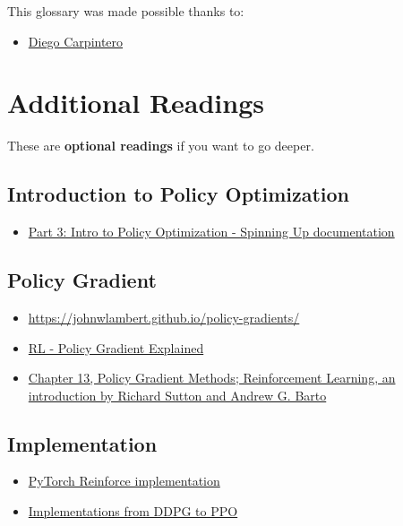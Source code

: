 \documentclass[11pt,a4paper]{article}
\begin{document}
This glossary was made possible thanks to:

\begin{itemize}
\tightlist
\item
  \href{https://github.com/dcarpintero}{Diego Carpintero}
\end{itemize}

\section{Additional Readings}\label{additional-readings}

These are \textbf{optional readings} if you want to go deeper.

\subsection{Introduction to Policy Optimization}\label{introduction-to-policy-optimization}

\begin{itemize}
\tightlist
\item
  \href{https://spinningup.openai.com/en/latest/spinningup/rl_intro3.html}{Part 3: Intro to Policy Optimization - Spinning Up documentation}
\end{itemize}

\subsection{Policy Gradient}\label{policy-gradient}

\begin{itemize}
\tightlist
\item
  \url{https://johnwlambert.github.io/policy-gradients/}
\item
  \href{https://jonathan-hui.medium.com/rl-policy-gradients-explained-9b13b688b146}{RL - Policy Gradient Explained}
\item
  \href{http://incompleteideas.net/book/RLbook2020.pdf}{Chapter 13, Policy Gradient Methods; Reinforcement Learning, an introduction by Richard Sutton and Andrew G. Barto}
\end{itemize}

\subsection{Implementation}\label{implementation}

\begin{itemize}
\tightlist
\item
  \href{https://github.com/pytorch/examples/blob/main/reinforcement_learning/reinforce.py}{PyTorch Reinforce implementation}
\item
  \href{https://github.com/MrSyee/pg-is-all-you-need}{Implementations from DDPG to PPO}
\end{itemize}
\end{document}
